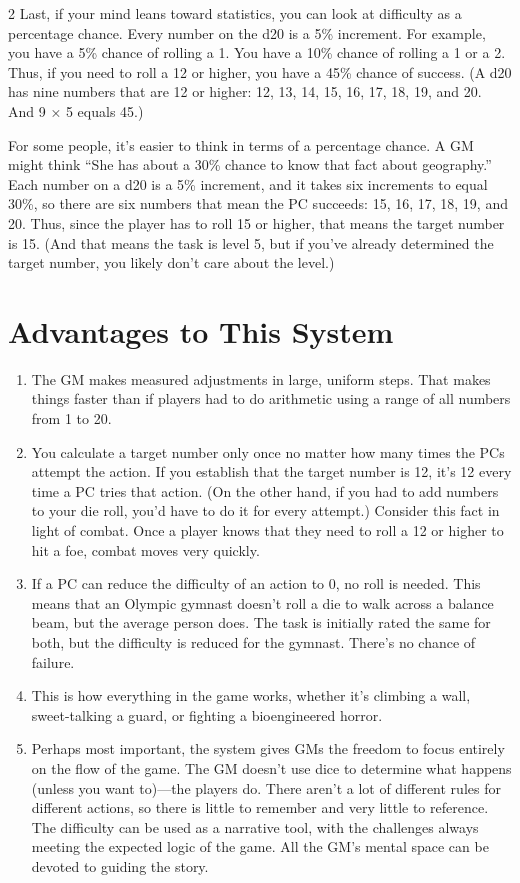 \begin{multicols}{2}
Last, if your mind leans toward statistics, you can look at difficulty as a percentage chance. Every number on the d20 is a 5\% increment. For example, you have a 5\% chance of rolling a 1. You have a 10\% chance of rolling a 1 or a 2. Thus, if you need to roll a 12 or higher, you have a 45\% chance of success. (A d20 has nine numbers that are 12 or higher: 12, 13, 14, 15, 16, 17, 18, 19, and 20. And 9 × 5 equals 45.)

For some people, it’s easier to think in terms of a percentage chance. A GM might think “She has about a 30\% chance to know that fact about geography.” Each number on a d20 is a 5\% increment, and it takes six increments to equal 30\%, so there are six numbers that mean the PC succeeds: 15, 16, 17, 18, 19, and 20. Thus, since the player has to roll 15 or higher, that means the target number is 15. (And that means the task is level 5, but if you’ve already determined the target number, you likely don’t care about the level.)

\section{Advantages to This System}

\begin{enumerate}
\item The GM makes measured adjustments in large, uniform steps. That makes things faster than if players had to do arithmetic using a range of all numbers from 1 to 20.
\item You calculate a target number only once no matter how many times the PCs attempt the action. If you establish that the target number is 12, it’s 12 every time a PC tries that action. (On the other hand, if you had to add numbers to your die roll, you’d have to do it for every attempt.) Consider this fact in light of combat. Once a player knows that they need to roll a 12 or higher to hit a foe, combat moves very quickly.
\item If a PC can reduce the difficulty of an action to 0, no roll is needed. This means that an Olympic gymnast doesn’t roll a die to walk across a balance beam, but the average person does. The task is initially rated the same for both, but the difficulty is reduced for the gymnast. There’s no chance of failure.
\item This is how everything in the game works, whether it’s climbing a wall,
sweet-talking a guard, or fighting a bioengineered horror.
\item Perhaps most important, the system gives GMs the freedom to focus entirely on the flow of the game. The GM doesn’t use dice to determine what happens (unless you want to)—the players do. There aren’t a lot of different rules for different actions, so there is little to remember and very little to reference. The difficulty can be used as a narrative tool, with the challenges always meeting the expected logic of the game. All the GM’s mental space can be devoted to guiding the story.
\end{enumerate}


\end{multicols}
